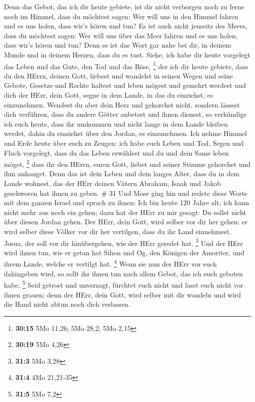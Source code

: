  Denn das Gebot, das ich dir heute gebiete, ist dir nicht
verborgen noch zu ferne  noch im Himmel, dass du möchtest
sagen: Wer will uns in den Himmel fahren und es uns holen, dass wir's
hören und tun?  Es ist auch nicht jenseits des Meers, dass
du möchtest sagen: Wer will uns über das Meer fahren und es uns holen,
dass wir's hören und tun?  Denn es ist das Wort gar nahe
bei dir, in deinem Munde und in deinem Herzen, dass du es tust.
 Siehe, ich habe dir heute vorgelegt das Leben und das
Gute, den Tod und das Böse, \footnote{\textbf{30:15} 5Mo 11,26; 5Mo
  28,2; 5Mo 2,15}  der ich dir heute gebiete, dass du den
HErrn, deinen Gott, liebest und wandelst in seinen Wegen und seine
Gebote, Gesetze und Rechte haltest und leben mögest und gemehrt werdest
und dich der HErr, dein Gott, segne in dem Lande, in das du einziehst,
es einzunehmen.  Wendest du aber dein Herz und gehorchst
nicht, sondern lässest dich verführen, dass du andere Götter anbetest
und ihnen dienest,  so verkündige ich euch heute, dass ihr
umkommen und nicht lange in dem Lande bleiben werdet, dahin du einziehst
über den Jordan, es einzunehmen.  Ich nehme Himmel und Erde
heute über euch zu Zeugen: ich habe euch Leben und Tod, Segen und Fluch
vorgelegt, dass du das Leben erwählest und du und dein Same leben möget,
\footnote{\textbf{30:19} 5Mo 4,26}  dass ihr den HErrn,
euren Gott, liebet und seiner Stimme gehorchet und ihm anhanget. Denn
das ist dein Leben und dein langes Alter, dass du in dem Lande wohnest,
das der HErr deinen Vätern Abraham, Isaak und Jakob geschworen hat ihnen
zu geben. \# 31  Und Mose ging hin und redete diese Worte
mit dem ganzen Israel  und sprach zu ihnen: Ich bin heute
120 Jahre alt; ich kann nicht mehr aus noch ein gehen; dazu hat der HErr
zu mir gesagt: Du sollst nicht über diesen Jordan gehen. 
Der HErr, dein Gott, wird selber vor dir her gehen; er wird selber diese
Völker vor dir her vertilgen, dass du ihr Land einnehmest. Josua, der
soll vor dir hinübergehen, wie der HErr geredet hat. \footnote{\textbf{31:3}
  5Mo 3,28}  Und der HErr wird ihnen tun, wie er getan hat
Sihon und Og, den Königen der Amoriter, und ihrem Lande, welche er
vertilgt hat. \footnote{\textbf{31:4} 4Mo 21,21-35}  Wenn
sie nun der HErr vor euch dahingeben wird, so sollt ihr ihnen tun nach
allem Gebot, das ich euch geboten habe. \footnote{\textbf{31:5} 5Mo 7,2}
 Seid getrost und unverzagt, fürchtet euch nicht und lasst
euch nicht vor ihnen grauen; denn der HErr, dein Gott, wird selber mit
dir wandeln und wird die Hand nicht abtun noch dich verlassen.

